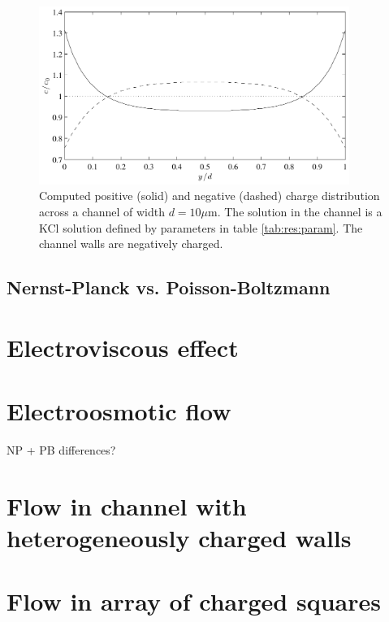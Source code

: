 \begin{figure}
\begin{center}
\includegraphics[width=0.9\textwidth]{fig/charge_1d.pdf}
\end{center}
\caption{Computed positive (solid) and negative (dashed) charge
  distribution across a channel of width $d = 10 \mu$m. The solution
  in the channel is a KCl solution defined by parameters in table
  \ref{tab:res:param}. The channel walls are negatively charged.}
\label{fig:res:c_1d}
\end{figure}

\subsection{Nernst-Planck vs. Poisson-Boltzmann}

\section{Electroviscous effect}

\section{Electroosmotic flow}
NP + PB differences?
\section{Flow in channel with heterogeneously charged walls}

\section{Flow in array of charged squares}
